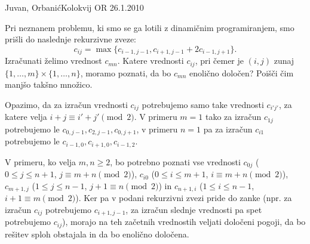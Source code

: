 \begin{naloga}{Juvan, Orbanić}{Kolokvij OR 26.1.2010}
\begin{vprasanje}
Pri neznanem problemu, ki smo se ga lotili z dinamičnim programiranjem,
smo prišli do naslednje rekurzivne zveze:
$$
c_{ij} = \max\{c_{i-1,j-1}, c_{i+1,j-1} + 2c_{i-1,j+1}\} .
$$
Izračunati želimo vrednost $c_{mn}$.
Katere vrednosti $c_{ij}$,
pri čemer je $(i, j)$ zunaj $\{1, \dots, m\} \times \{1, \dots, n\}$,
moramo poznati, da bo $c_{mn}$ enolično določen?
Poišči čim manjšo takšno množico.
\end{vprasanje}

\begin{odgovor}
Opazimo, da za izračun vrednosti $c_{ij}$
potrebujemo samo take vrednosti $c_{i'j'}$,
za katere velja $i+j \equiv i'+j' \pmod{2}$.
V primeru $m = 1$ tako za izračun $c_{1j}$
potrebujemo le $c_{0,j-1}, c_{2,j-1}, c_{0,j+1}$,
v primeru $n = 1$ pa za izračun $c_{i1}$
potrebujemo le $c_{i-1,0}, c_{i+1,0}, c_{i-1,2}$.

V primeru, ko velja $m, n \ge 2$,
bo potrebno poznati vse vrednosti
$c_{0j}$ ($0 \le j \le n+1$, $j \equiv m+n \pmod{2}$),
$c_{i0}$ ($0 \le i \le m+1$, $i \equiv m+n \pmod{2}$),
$c_{m+1,j}$ ($1 \le j \le n-1$, $j+1 \equiv n \pmod{2}$)
in $c_{n+1,i}$ ($1 \le i \le n-1$, $i+1 \equiv m \pmod{2}$).
Ker pa v podani rekurzivni zvezi pride do zanke
(npr. za izračun $c_{ij}$ potrebujemo $c_{i+1,j-1}$,
za izračun slednje vrednosti pa spet potrebujemo $c_{ij}$),
morajo na teh začetnih vrednostih veljati določeni pogoji,
da bo rešitev sploh obstajala in da bo enolično določena.
\end{odgovor}
\end{naloga}
